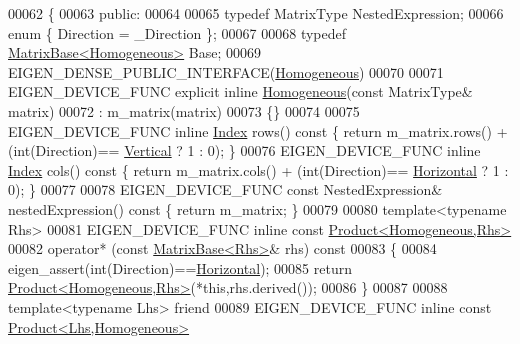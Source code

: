 \begin{DoxyCode}
00062 \{
00063   \textcolor{keyword}{public}:
00064 
00065     \textcolor{keyword}{typedef} MatrixType NestedExpression;
00066     \textcolor{keyword}{enum} \{ Direction = \_Direction \};
00067 
00068     \textcolor{keyword}{typedef} \hyperlink{group___core___module_class_eigen_1_1_matrix_base}{MatrixBase<Homogeneous>} Base;
00069     EIGEN\_DENSE\_PUBLIC\_INTERFACE(\hyperlink{group___geometry___module_class_eigen_1_1_homogeneous}{Homogeneous})
00070 
00071     EIGEN\_DEVICE\_FUNC \textcolor{keyword}{explicit} \textcolor{keyword}{inline} \hyperlink{group___geometry___module_class_eigen_1_1_homogeneous}{Homogeneous}(\textcolor{keyword}{const} MatrixType& matrix)
00072       : m\_matrix(matrix)
00073     \{\}
00074 
00075     EIGEN\_DEVICE\_FUNC \textcolor{keyword}{inline} \hyperlink{namespace_eigen_a62e77e0933482dafde8fe197d9a2cfde}{Index} rows()\textcolor{keyword}{ const }\{ \textcolor{keywordflow}{return} m\_matrix.rows() + (int(Direction)==
      \hyperlink{group__enums_ggad49a7b3738e273eb00932271b36127f7addca718e0564723df21d61b94b1198be}{Vertical}   ? 1 : 0); \}
00076     EIGEN\_DEVICE\_FUNC \textcolor{keyword}{inline} \hyperlink{namespace_eigen_a62e77e0933482dafde8fe197d9a2cfde}{Index} cols()\textcolor{keyword}{ const }\{ \textcolor{keywordflow}{return} m\_matrix.cols() + (int(Direction)==
      \hyperlink{group__enums_ggad49a7b3738e273eb00932271b36127f7aae8a16b3b9272683c1162915f6d892be}{Horizontal} ? 1 : 0); \}
00077     
00078     EIGEN\_DEVICE\_FUNC \textcolor{keyword}{const} NestedExpression& nestedExpression()\textcolor{keyword}{ const }\{ \textcolor{keywordflow}{return} m\_matrix; \}
00079 
00080     \textcolor{keyword}{template}<\textcolor{keyword}{typename} Rhs>
00081     EIGEN\_DEVICE\_FUNC \textcolor{keyword}{inline} \textcolor{keyword}{const} \hyperlink{group___core___module_class_eigen_1_1_product}{Product<Homogeneous,Rhs>}
00082     operator* (\textcolor{keyword}{const} \hyperlink{group___core___module_class_eigen_1_1_matrix_base}{MatrixBase<Rhs>}& rhs)\textcolor{keyword}{ const}
00083 \textcolor{keyword}{    }\{
00084       eigen\_assert(\textcolor{keywordtype}{int}(Direction)==\hyperlink{group__enums_ggad49a7b3738e273eb00932271b36127f7aae8a16b3b9272683c1162915f6d892be}{Horizontal});
00085       \textcolor{keywordflow}{return} \hyperlink{group___core___module_class_eigen_1_1_product}{Product<Homogeneous,Rhs>}(*\textcolor{keyword}{this},rhs.derived());
00086     \}
00087 
00088     \textcolor{keyword}{template}<\textcolor{keyword}{typename} Lhs> \textcolor{keyword}{friend}
00089     EIGEN\_DEVICE\_FUNC \textcolor{keyword}{inline} \textcolor{keyword}{const} \hyperlink{group___core___module_class_eigen_1_1_product}{Product<Lhs,Homogeneous>}

\end{DoxyCode}
